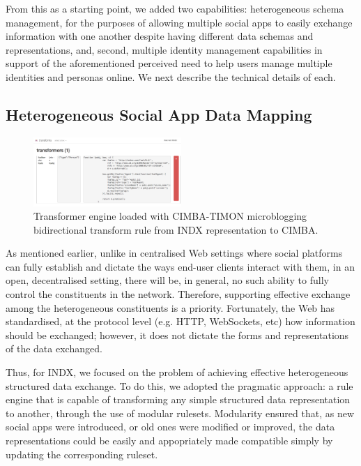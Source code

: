 \documentclass{sig-alternate}
\begin{document}
From this as a starting point, we added two capabilities: heterogeneous schema management, for the purposes
of allowing multiple social apps to easily exchange information with one another despite having different
data schemas and representations, and, second, multiple identity management capabilities in support of
the aforementioned perceived need to help users manage multiple identities and personas online. 
We next describe the technical details of each.

\subsection{Heterogeneous Social App Data Mapping}

\begin{figure}[t!]
 	  \begin{center}
        \includegraphics[width=0.50\textwidth]{transformer}
       \end{center}
    \caption{%
        Transformer engine loaded with CIMBA-TIMON microblogging bidirectional transform rule from INDX representation to CIMBA.
    }%
  \label{fig:transform}
\end{figure}


As mentioned earlier, unlike in centralised Web settings where social platforms can fully establish and dictate the ways end-user clients interact with them, in an open, decentralised setting, there will be, in general, no such ability to fully control the constituents in the network.  Therefore, supporting effective exchange among the heterogeneous constituents is a priority.  Fortunately, the Web has standardised, at the protocol level (e.g. HTTP, WebSockets, etc) how information should be exchanged; however, it does not dictate the forms and representations of the data exchanged. 

Thus, for INDX, we focused on the problem of achieving effective heterogeneous structured data exchange.  To do this, we adopted the pragmatic approach: a rule engine that is capable of transforming any simple structured data representation to another, through the use of modular rulesets.  Modularity ensured that, as new social apps were introduced, or old ones were modified or improved, the data representations could be easily and appopriately made compatible simply by updating the corresponding ruleset. 
\end{document}
